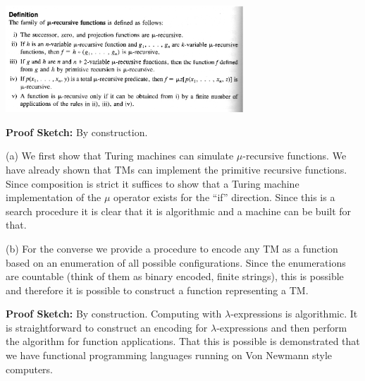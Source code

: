\documentclass[a4paper,blends,pdf,colorBG,slideColor]{prosper}
\begin{document}

\begin{center}
\includegraphics[height=40mm]{images/mu-rec-functions.eps}
\end{center}
\es



{\bf Proof Sketch:} By construction.

(a) We first show that Turing machines can simulate $\mu$-recursive functions.  We have already shown that TMs can implement
the primitive recursive functions.  Since composition is strict it suffices to show that a Turing machine implementation
of the $\mu$ operator exists for the ``if'' direction.  Since this is a search procedure it
is clear that it is algorithmic and a machine can be built for that.

(b) For the converse we provide a procedure to encode any TM as a function based on
an enumeration of all possible configurations.  Since the enumerations are countable (think of them as binary encoded, finite strings), this is possible and therefore it is possible to construct a function representing a TM.

\es



{\bf Proof Sketch:} By construction.  Computing with $\lambda$-expressions is algorithmic.  It is straightforward
to construct an encoding for $\lambda$-expressions and then perform the algorithm for function applications.
That this is possible is demonstrated that we have functional programming languages running on Von Newmann
style computers.

\es


\end{document}
